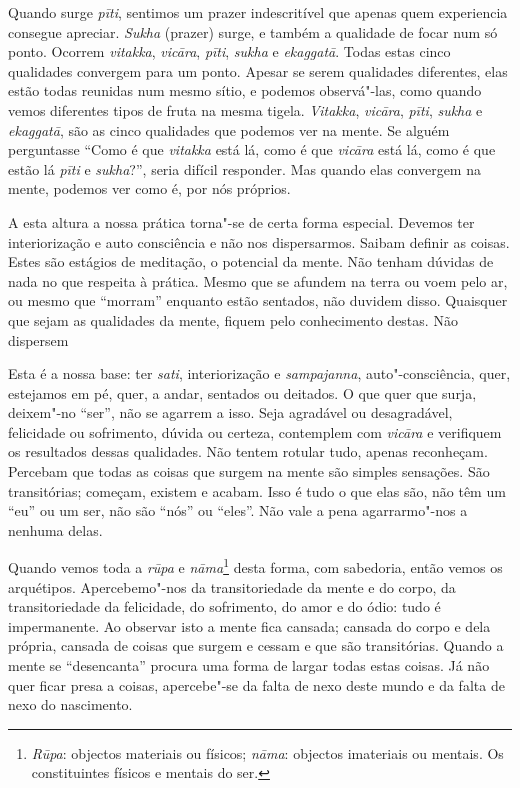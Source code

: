 Quando surge \emph{pīti}, sentimos um prazer indescritível que apenas
quem experiencia consegue apreciar. \emph{Sukha} (prazer) surge, e
também a qualidade de focar num só ponto. Ocorrem \emph{vitakka},
\emph{vicāra}, \emph{pīti}, \emph{sukha} e \emph{ekaggatā}. Todas estas
cinco qualidades convergem para um ponto. Apesar se serem qualidades
diferentes, elas estão todas reunidas num mesmo sítio, e podemos
observá"-las, como quando vemos diferentes tipos de fruta na mesma
tigela. \emph{Vitakka}, \emph{vicāra}, \emph{pīti}, \emph{sukha} e
\emph{ekaggatā}, são as cinco qualidades que podemos ver na mente. Se
alguém perguntasse ``Como é que \emph{vitakka} está lá, como é que
\emph{vicāra} está lá, como é que estão lá \emph{pīti} e
\emph{sukha}?'', seria difícil responder. Mas quando elas convergem na
mente, podemos ver como é, por nós próprios.

A esta altura a nossa prática torna"-se de certa forma especial. Devemos
ter interiorização e auto consciência e não nos dispersarmos. Saibam
definir as coisas. Estes são estágios de meditação, o potencial da
mente. Não tenham dúvidas de nada no que respeita à prática. Mesmo que
se afundem na terra ou voem pelo ar, ou mesmo que ``morram'' enquanto
estão sentados, não duvidem disso. Quaisquer que sejam as qualidades da
mente, fiquem pelo conhecimento destas. Não dispersem

Esta é a nossa base: ter \emph{sati}, interiorização e
\emph{sampajanna}, auto"-consciência, quer, estejamos em pé, quer, a
andar, sentados ou deitados. O que quer que surja, deixem"-no ``ser'',
não se agarrem a isso. Seja agradável ou desagradável, felicidade ou
sofrimento, dúvida ou certeza, contemplem com \emph{vicāra} e verifiquem
os resultados dessas qualidades. Não tentem rotular tudo, apenas
reconheçam. Percebam que todas as coisas que surgem na mente são simples
sensações. São transitórias; começam, existem e acabam. Isso é tudo o
que elas são, não têm um ``eu'' ou um ser, não são ``nós'' ou ``eles''.
Não vale a pena agarrarmo"-nos a nenhuma delas.

Quando vemos toda a \emph{rūpa} e \emph{nāma}\footnote{%
  \emph{Rūpa}: objectos materiais ou físicos; \emph{nāma}: objectos
  imateriais ou mentais. Os constituintes físicos e mentais do ser.
}
desta forma, com
sabedoria, então vemos os arquétipos. Apercebemo"-nos da transitoriedade
da mente e do corpo, da transitoriedade da felicidade, do sofrimento, do
amor e do ódio: tudo é impermanente. Ao observar isto a mente fica
cansada; cansada do corpo e dela própria, cansada de coisas que surgem e
cessam e que são transitórias. Quando a mente se ``desencanta'' procura
uma forma de largar todas estas coisas. Já não quer ficar presa a
coisas, apercebe"-se da falta de nexo deste mundo e da falta de nexo do
nascimento.


